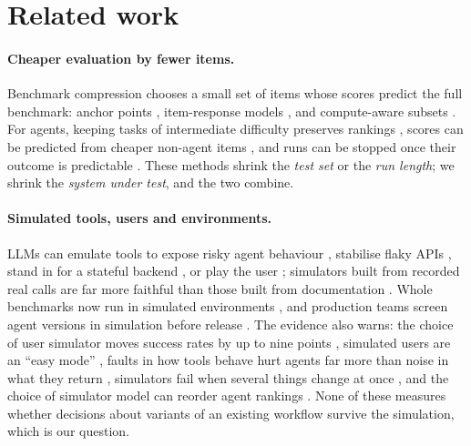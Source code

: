 \section{Related work}

\paragraph{Cheaper evaluation by fewer items.}
Benchmark compression chooses a small set of items whose scores predict the full benchmark:
anchor points \citep{vivek2023anchor}, item-response models \citep{polo2024tinybenchmarks,kipnis2024metabench}, and
compute-aware subsets \citep{perlitz2023efficient}. For agents, keeping tasks of intermediate difficulty
preserves rankings \citep{ndzomga2026efficient}, scores can be predicted from cheaper non-agent items
\citep{song2026pace}, and runs can be stopped once their outcome is predictable \citep{shi2026earlyeval}. These
methods shrink the \emph{test set} or the \emph{run length}; we shrink the \emph{system under test},
and the two combine.

\paragraph{Simulated tools, users and environments.}
LLMs can emulate tools to expose risky agent behaviour \citep{ruan2023identifying}, stabilise flaky APIs
\citep{guo2024stabletoolbench,guo2025stabletoolbenchmirrorapi}, stand in for a stateful backend \citep{chuang2026toward}, or play
the user \citep{yao2024taubench,barres2025tau2bench}; simulators built from recorded real calls are far more
faithful than those built from documentation \citep{wang2026mcppersona}. Whole benchmarks now run in
simulated environments \citep{hu2026occubench}, and production teams screen agent versions in simulation
before release \citep{alcoba2026screen}. The evidence also warns: the choice of user simulator moves success
rates by up to nine points \citep{seshadri2026lost}, simulated users are an ``easy mode''
\citep{zhou2026mind}, faults in how tools behave hurt agents far more than noise in what they return
\citep{zhou2026when}, simulators fail when several things change at once \citep{liu2026envsimbench}, and
the choice of simulator model can reorder agent rankings \citep{hu2026occubench}. None of these measures
whether decisions about variants of an existing workflow survive the simulation, which is our
question.

